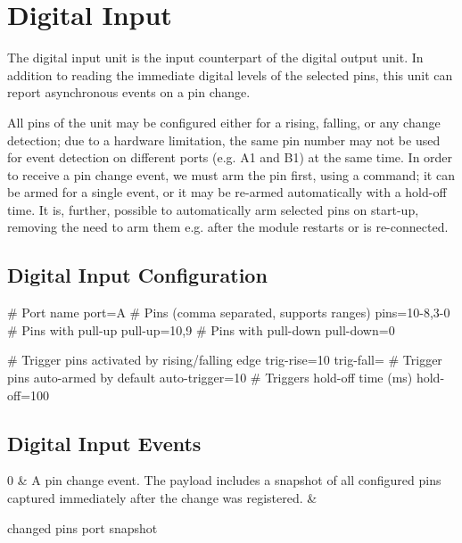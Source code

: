 \section{Digital Input}

The digital input unit is the input counterpart of the digital output unit. In addition to reading the immediate digital levels of the selected pins, this unit can report asynchronous events on a pin change. 

All pins of the unit may be configured either for a rising, falling, or any change detection; due to a hardware limitation, the same pin number may not be used for event detection on different ports (e.g. A1 and B1) at the same time. In order to receive a pin change event, we must arm the pin first, using a command; it can be armed for a single event, or it may be re-armed automatically with a hold-off time. It is, further, possible to automatically arm selected pins on start-up, removing the need to arm them e.g. after the module restarts or is re-connected.

\subsection{Digital Input Configuration}

\begin{inicode}
[DI:in@2]
# Port name
port=A
# Pins (comma separated, supports ranges)
pins=10-8,3-0
# Pins with pull-up
pull-up=10,9
# Pins with pull-down
pull-down=0

# Trigger pins activated by rising/falling edge
trig-rise=10
trig-fall=
# Trigger pins auto-armed by default
auto-trigger=10
# Triggers hold-off time (ms)
hold-off=100
\end{inicode}

\subsection{Digital Input Events}

\begin{cmdlist}

	0 & 
	A pin change event. The payload includes a snapshot of all configured pins captured immediately after the change was registered.
	& \begin{cmdpld}
		 changed pins
		 port snapshot
	\end{cmdpld}

\end{cmdlist}

